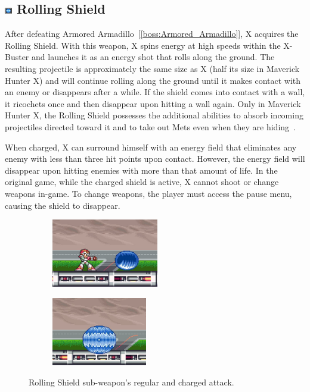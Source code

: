 \subsection{\includegraphics[width=12px, height=10px]{figures/X1/weapons/Rolling_S.jpg} Rolling Shield}\label{Rolling_shield}
After defeating Armored Armadillo~[\ref{boss:Armored_Armadillo}], X acquires the Rolling Shield. With this weapon, X spins energy at high speeds within the X-Buster and launches it as an energy shot that rolls along the ground. The resulting projectile is approximately the same size as X (half its size in Maverick Hunter X) and will continue rolling along the ground until it makes contact with an enemy or disappears after a while. If the shield comes into contact with a wall, it ricochets once and then disappear upon hitting a wall again. Only in Maverick Hunter X, the Rolling Shield possesses the additional abilities to absorb incoming projectiles directed toward it and to take out Mets even when they are hiding~\cite{wiki:Rolling_shield}. 

When charged, X can surround himself with an energy field that eliminates any enemy with less than three hit points upon contact. However, the energy field will disappear upon hitting enemies with more than that amount of life. In the original game, while the charged shield is active, X cannot shoot or change weapons in-game. To change weapons, the player must access the pause menu, causing the shield to disappear.

\begin{figure}[htp]
	\centering
	\begin{subfigure}{0.4\linewidth}
		\includegraphics[height=3cm]{figures/X1/weapons/Rolling_shield_1.jpg}	
	\end{subfigure}
	\begin{subfigure}{0.4\linewidth}
		\includegraphics[height=3cm]{figures/X1/weapons/Rolling_shield_2.jpg}	
	\end{subfigure}
	\caption{Rolling Shield sub-weapon's regular and charged attack.}
\end{figure}

